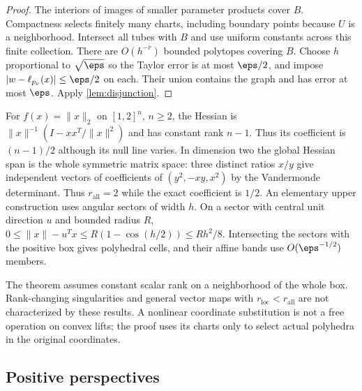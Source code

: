 \begin{proof}
The interiors of images of smaller parameter products cover $B$.
Compactness selects finitely many charts, including boundary points
because $U$ is a neighborhood. Intersect all tubes with $B$ and use
uniform constants across this finite collection. There are
$O(h^{-r})$ bounded polytopes covering $B$. Choose $h$ proportional
to $\sqrt\eps$ so the Taylor error is at most $\eps/2$, and impose
$|w-\ell_{p_\nu}(x)|\le\eps/2$ on each. Their union contains the graph
and has error at most $\eps$. Apply \cref{lem:disjunction}.
\end{proof}

For $f(x)=\|x\|_2$ on $[1,2]^n$, $n\ge2$, the Hessian is
$\|x\|^{-1}(I-xx^T/\|x\|^2)$ and has constant rank $n-1$.
Thus its coefficient is $(n-1)/2$ although its null line varies.
In dimension two the global Hessian span is the whole symmetric
matrix space: three distinct ratios $x/y$ give independent vectors
of coefficients of $(y^2,-xy,x^2)$ by the Vandermonde determinant.
Thus $r_{\mathrm{all}}=2$ while the exact coefficient is $1/2$.
An elementary upper construction uses angular sectors of width $h$.
On a sector with central unit direction $u$ and bounded radius $R$,
$0\le\|x\|-u^Tx\le R(1-\cos(h/2))\le Rh^2/8$.
Intersecting the sectors with the positive box gives polyhedral cells,
and their affine bands use $O(\eps^{-1/2})$ members.

The theorem assumes constant scalar rank on a neighborhood of the
whole box. Rank-changing singularities and general vector maps with
$r_{\mathrm{loc}}<r_{\mathrm{all}}$ are not characterized by these
results. A nonlinear coordinate substitution is not a free operation
on convex lifts; the proof uses its charts only to select actual
polyhedra in the original coordinates.

\subsection{Positive perspectives}\label{subsec:perspective}

